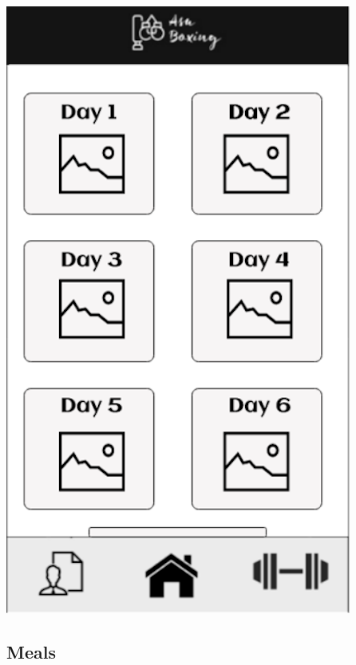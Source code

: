 \documentclass[a4paper,12pt]{report}
\begin{document}
\begin{center}
\includegraphics[scale=0.377]{images/days.png}
\end{center}

\subsection{Meals}
\end{document}
